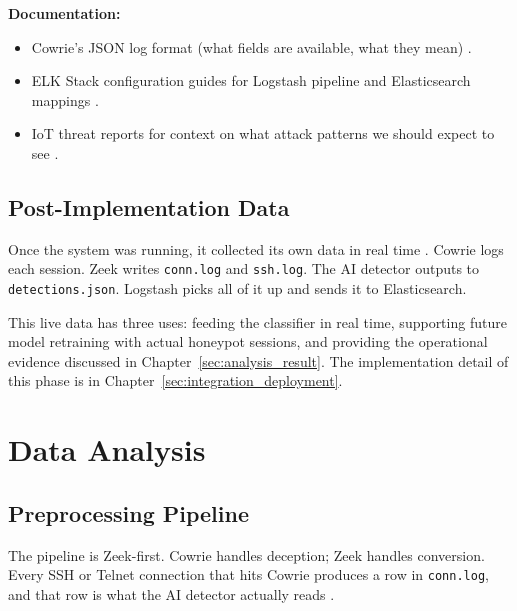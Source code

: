 \textbf{Documentation:}

\begin{itemize}
\item Cowrie's JSON log format (what fields are available, what they mean) \cite{9071014,log2evt2025}.
\item ELK Stack configuration guides for Logstash pipeline and Elasticsearch mappings \cite{9001068}.
\item IoT threat reports for context on what attack patterns we should expect to see \cite{mahmood2024exploring,islam2023large}.
\end{itemize}

\subsection{Post-Implementation Data}
\label{subsec:post_implementation_data}

Once the system was running, it collected its own data in real time \cite{lee2021classification,suareztangil2023stories}. Cowrie logs each session. Zeek writes \texttt{conn.log} and \texttt{ssh.log}. The AI detector outputs to \texttt{detections.json}. Logstash picks all of it up and sends it to Elasticsearch.

This live data has three uses: feeding the classifier in real time, supporting future model retraining with actual honeypot sessions, and providing the operational evidence discussed in Chapter~\ref{sec:analysis_result}. The implementation detail of this phase is in Chapter~\ref{sec:integration_deployment}.

\section{Data Analysis}
\label{sec:data_analysis}

\subsection{Preprocessing Pipeline}
\label{subsec:preprocessing_pipeline}

The pipeline is Zeek-first. Cowrie handles deception; Zeek handles conversion. Every SSH or Telnet connection that hits Cowrie produces a row in \texttt{conn.log}, and that row is what the AI detector actually reads \cite{9071014,log2evt2025}.

